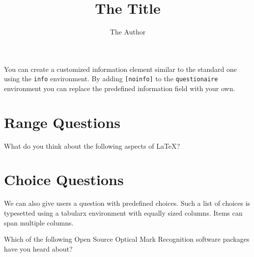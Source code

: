 \documentclass[
  english,
  ]{sdapsclassic}
\author{The Author}
\title{The Title}
\begin{document}

  \begin{questionnaire}
  \begin{Form}
    \begin{info}
      You can create a customized information element similar to the standard
      one using the \texttt{info} environment. By adding \texttt{[noinfo]} to
      the \texttt{questionaire} environment you can replace the predefined
      information field with your own.
    \end{info}


    \section{Range Questions}


    \begin{markgroup}{What do you think about the following aspects of \LaTeX?}
    \end{markgroup}

    \section{Choice Questions}
    We can also give users a question with predefined choices. Such a list
    of choices is typesetted using a tabularx environment with equally
    sized columns. Items can span multiple columns.

    \begin{choicequestion}[cols=3]{Which of the following Open Source
                                   Optical Mark Recognition software
                                   packages have you heard about?}


\end{choicequestion}
\end{Form}
\end{questionnaire}
\end{document}
